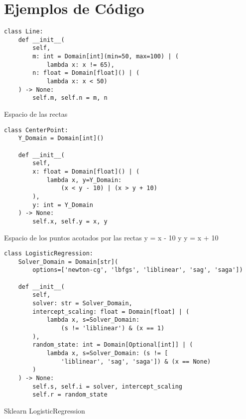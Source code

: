 \tableofcontents

\chapter*{Ejemplos de Código}\label{chapter:examples}

\begin{listing}[!ht]
    \begin{verbatim}
class Line:
    def __init__(
        self,
        m: int = Domain[int](min=50, max=100) | (
            lambda x: x != 65),
        n: float = Domain[float]() | (
            lambda x: x < 50)
    ) -> None:
        self.m, self.n = m, n
    \end{verbatim}
    \caption{Espacio de las rectas}
    \label{lst:rectas}
\end{listing}


\begin{listing}[!ht]
    \begin{verbatim}
class CenterPoint:
    Y_Domain = Domain[int]()
    
    def __init__(
        self,
        x: float = Domain[float]() | (
            lambda x, y=Y_Domain: 
                (x < y - 10) | (x > y + 10)
        ),
        y: int = Y_Domain
    ) -> None:
        self.x, self.y = x, y
    \end{verbatim}
    \caption{Espacio de los puntos acotados por las rectas y = x - 10 y y = x + 10}
    \label{lst:points}
\end{listing}

\begin{listing}[!ht]
    \begin{verbatim}
class LogisticRegression:
    Solver_Domain = Domain[str](
        options=['newton-cg', 'lbfgs', 'liblinear', 'sag', 'saga'])

    def __init__(
        self,
        solver: str = Solver_Domain,
        intercept_scaling: float = Domain[float] | (
            lambda x, s=Solver_Domain: 
                (s != 'liblinear') & (x == 1)
        ),
        random_state: int = Domain[Optional[int]] | (
            lambda x, s=Solver_Domain: (s != [
                'liblinear', 'sag', 'saga']) & (x == None)
        )
    ) -> None:
        self.s, self.i = solver, intercept_scaling
        self.r = random_state
    \end{verbatim}
    \caption{Sklearn LogisticRegression}
    \label{lst:sklearn}
\end{listing}

